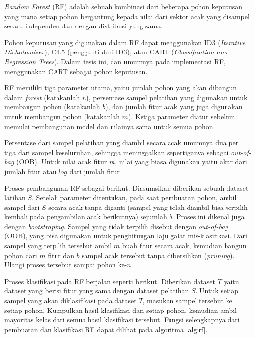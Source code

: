 \textit{Random Forest} (RF) \cite{breiman2001random}
adalah sebuah kombinasi dari beberapa pohon keputusan yang mana setiap pohon
bergantung kepada nilai dari vektor acak yang disampel secara independen dan
dengan distribusi yang sama.

Pohon keputusan yang digunakan dalam RF dapat menggunakan ID3
(\textit{Iterative Dichotomiser}), C4.5 (pengganti dari ID3), atau CART
(\textit{Classification and Regression Trees}).
Dalam tesis ini, dan umumnya pada implementasi RF, menggunakan CART sebagai
pohon keputusan.

RF memiliki tiga parameter utama, yaitu
jumlah pohon yang akan dibangun dalam \textit{forest} (katakanlah $n$),
persentase sampel pelatihan yang digunakan untuk membangun pohon (katakanlah
$b$),
dan jumlah fitur acak yang juga digunakan untuk membangun pohon (katakanlah
$m$).
Ketiga parameter diatur sebelum memulai pembangunan model dan nilainya sama
untuk semua pohon.

Persentase dari sampel pelatihan yang diambil secara acak umumnya dua per tiga
dari sampel keseluruhan, sehingga meninggalkan sepertiganya sebagai
\textit{out-of-bag} (OOB).
Untuk nilai acak fitur $m$, nilai yang biasa digunakan yaitu akar dari jumlah
fitur atau $log$ dari jumlah fitur \cite{breiman2001random}.

Proses pembangunan RF sebagai berikut.
Diasumsikan diberikan sebuah dataset latihan $S$.
Setelah parameter ditentukan, pada saat pembuatan pohon, ambil sampel dari $S$
secara acak tanpa diganti (sampel yang telah diambil bisa terpilih kembali pada
pengambilan acak berikutnya) sejumlah $b$.
Proses ini dikenal juga dengan \textit{bootstraping}.
Sampel yang tidak terpilih disebut dengan \textit{out-of-bag} (OOB), yang
bisa digunakan untuk penghitungan laju galat mis-klasifikasi.
Dari sampel yang terpilih tersebut ambil $m$ buah fitur secara acak, kemudian
bangun pohon dari $m$ fitur dan $b$ sampel acak tersebut tanpa dibersihkan
(\textit{pruning}).
Ulangi proses tersebut sampai pohon ke-$n$.

Proses klasifikasi pada RF berjalan seperti berikut.
Diberikan dataset $T$ yaitu dataset yang berisi fitur yang sama dengan dataset
pelatihan $S$.
Untuk setiap sampel yang akan diklasifikasi pada dataset $T$, masukan sampel
tersebut ke setiap pohon.
Kumpulkan hasil klasifikasi dari setiap pohon, kemudian ambil mayoritas kelas
dari semua hasil klasifikasi tersebut.
Fungsi selengkapnya dari pembuatan dan klasifikasi RF dapat dilihat pada
algoritma \ref{alg:rf}.
